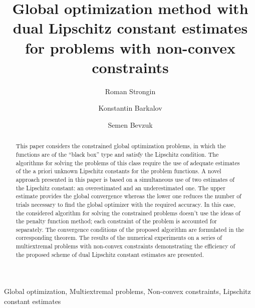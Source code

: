 \documentclass[review]{elsarticle}
\begin{document}
\begin{frontmatter}

\title{Global optimization method with dual Lipschitz constant estimates for problems with non-convex constraints}

\author{Roman Strongin}
\author{Konstantin Barkalov}
\author{Semen Bevzuk}
\address{Lobachevsky State University of Nizhni Novgorod, Nizhni Novgorod, Russia}

\begin{abstract}
This paper considers the constrained global optimization problems, in which the functions are of the “black box” type and satisfy the Lipschitz condition. The algorithms for solving the problems of this class require the use of adequate estimates of the a priori unknown Lipschitz constants for the problem functions. A novel approach presented in this paper is based on a simultaneous use of two estimates of the Lipschitz constant: an overestimated and an underestimated one. The upper estimate provides the global convergence whereas the lower one reduces the number of trials necessary to find the global optimizer with the required accuracy. In this case,  the considered algorithm for solving the constrained problems doesn’t use the ideas of the penalty function method; each constraint of the problem is accounted for separately. The convergence conditions of the proposed algorithm are formulated in the corresponding theorem. The results of the numerical experiments on a series of multiextremal problems with non-convex constraints demonstrating the efficiency of the proposed scheme of dual Lipschitz constant estimates are presented.
\end{abstract}

\begin{keyword}
Global optimization, Multiextremal problems, Non-convex constraints, Lipschitz constant estimates 
\end{keyword}

\end{frontmatter}

\linenumbers
\end{document}
